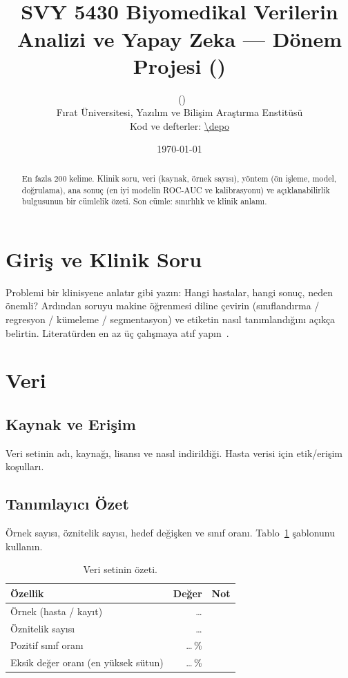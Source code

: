 \documentclass[11pt,a4paper]{article}
\title{\projebaslik\\[0.4em]{\large SVY 5430 Biyomedikal Verilerin Analizi ve Yapay Zeka --- Dönem Projesi (\projekodu)}}
\author{\ogrenci\ (\ogrencino)\\Fırat Üniversitesi, Yazılım ve Bilişim Araştırma Enstitüsü\\\small Kod ve defterler: \url{\depo}}
\date{\today}
\begin{document}
\maketitle

\begin{abstract}
En fazla 200 kelime. Klinik soru, veri (kaynak, örnek sayısı), yöntem (ön işleme, model, doğrulama), ana sonuç (en iyi modelin ROC-AUC ve kalibrasyonu) ve açıklanabilirlik bulgusunun bir cümlelik özeti. Son cümle: sınırlılık ve klinik anlamı.
\end{abstract}

\section{Giriş ve Klinik Soru}
Problemi bir klinisyene anlatır gibi yazın: Hangi hastalar, hangi sonuç, neden önemli? Ardından soruyu makine öğrenmesi diline çevirin (sınıflandırma / regresyon / kümeleme / segmentasyon) ve etiketin nasıl tanımlandığını açıkça belirtin. Literatürden en az üç çalışmaya atıf yapın~\cite{steyerberg2010}.

\section{Veri}
\subsection{Kaynak ve Erişim}
Veri setinin adı, kaynağı, lisansı ve nasıl indirildiği. Hasta verisi için etik/erişim koşulları.

\subsection{Tanımlayıcı Özet}
Örnek sayısı, öznitelik sayısı, hedef değişken ve sınıf oranı. Tablo~\ref{tab:veri} şablonunu kullanın.

\begin{table}[H]
\centering
\caption{Veri setinin özeti.}
\label{tab:veri}
\begin{tabular}{lrr}
\toprule
Özellik & Değer & Not \\
\midrule
Örnek (hasta / kayıt) & \ldots & \\
Öznitelik sayısı & \ldots & \\
Pozitif sınıf oranı & \ldots\,\% & \\
Eksik değer oranı (en yüksek sütun) & \ldots\,\% & \\
\bottomrule
\end{tabular}
\end{table}
\end{document}
